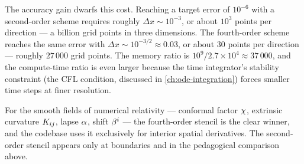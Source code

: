 The accuracy gain dwarfs this cost.  Reaching a target error of $10^{-6}$
with a second-order scheme requires roughly $\Delta x \sim 10^{-3}$, or
about $10^3$ points per direction --- a billion grid points in three
dimensions.  The fourth-order scheme reaches the same error with
$\Delta x \sim 10^{-3/2} \approx 0.03$, or about $30$ points per direction
--- roughly $27\,000$ grid points.  The memory ratio is $10^9 / 2.7 \times
10^4 \approx 37\,000$, and the compute-time ratio is even larger because
the time integrator's stability constraint (the CFL condition, discussed in
\cref{ch:ode-integration}) forces smaller time steps at finer resolution.

For the smooth fields of numerical relativity --- conformal factor
$\chi$, extrinsic curvature $K_{ij}$, lapse $\alpha$, shift
$\beta^{i}$ --- the fourth-order stencil is the clear
winner, and the codebase uses it exclusively for interior spatial
derivatives.  The second-order stencil appears only at boundaries and in
the pedagogical comparison above.
